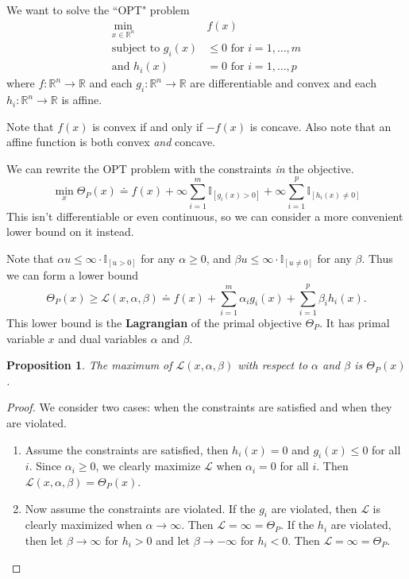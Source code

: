 \documentclass{article}
\newtheorem{prop}{Proposition}
\begin{document}
We want to solve the ``OPT" problem
\begin{align*}
	\min_{x \in \mathbb{R}^n} &f(x) \\
	\text{subject to } g_i(x) &\leq 0 \text{ for } i=1,\dots,m \\
	\text{and } h_i(x) &= 0 \text{ for } i=1,\dots,p
\end{align*}
where $f:\mathbb{R}^n \to \mathbb{R}$ and each $g_i:\mathbb{R}^n \to \mathbb{R}$ are differentiable and convex and each $h_i:\mathbb{R}^n \to \mathbb{R}$ is affine.

Note that $f(x)$ is convex if and only if $-f(x)$ is concave. Also note that an affine function is both convex \textit{and} concave.

We can rewrite the OPT problem with the constraints \textit{in} the objective.
\[
	\min_x \Theta_P(x) \doteq f(x) + \infty \sum_{i=1}^{m} \mathbb{I}_{[g_i(x) >0]}+\infty\sum_{i=1}^{p} \mathbb{I}_{[h_i(x) \neq 0]}
\] 
This isn't differentiable or even continuous, so we can consider a more convenient lower bound on it instead.

Note that $\alpha u \leq \infty \cdot \mathbb{I}_{[u >0]}$ for any $\alpha \geq 0$, and $\beta u \leq \infty \cdot \mathbb{I}_{[u \neq 0]}$ for any $\beta$. Thus we can form a lower bound
\[
	\Theta_P(x) \geq \mathcal{L}(x,\alpha,\beta) \doteq f(x) + \sum_{i=1}^{m} \alpha_i g_i(x) + \sum_{i=1}^{p} \beta_i h_i(x).
\] 
This lower bound is the \textbf{Lagrangian} of the primal objective $\Theta_P$. It has primal variable $x$ and dual variables $\alpha$ and $\beta$.

\begin{prop}
	The maximum of $\mathcal{L}(x,\alpha,\beta)$ with respect to $\alpha$ and $\beta$ is $\Theta_P(x)$.
\end{prop}
\begin{proof}
	We consider two cases: when the constraints are satisfied and when they are violated.
	\begin{enumerate}
		\item Assume the constraints are satisfied, then $h_i(x) = 0$ and $g_i(x) \leq 0$ for all $i$. Since $\alpha_i \geq 0$, we clearly maximize $\mathcal{L}$ when $\alpha_i=0$ for all $i$. Then $\mathcal{L}(x,\alpha,\beta) = \Theta_P(x)$.
		\item Now assume the constraints are violated. If the $g_i$ are violated, then $\mathcal{L}$ is clearly maximized when $\alpha\to \infty$. Then $\mathcal{L}=\infty=\Theta_P$. If the $h_i$ are violated, then let $\beta\to\infty$ for $h_i > 0$ and let $\beta\to-\infty$ for $h_i < 0$. Then $\mathcal{L}=\infty=\Theta_P$.
	\end{enumerate}
\end{proof}
\end{document}
